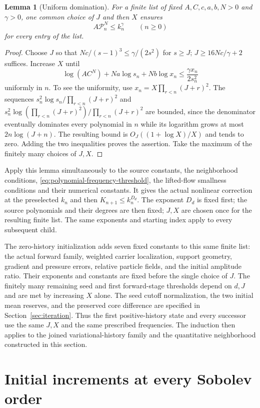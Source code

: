 \documentclass[11pt]{article}
\newtheorem{lemma}[theorem]{Lemma}
\theoremstyle{definition}
\begin{document}
\begin{lemma}[Uniform domination]\label{lem:uniform-source-domination}
For a finite list of fixed $A,C,c,a,b,N>0$ and $\gamma>0$, one common
choice of $J$ and then $X$ ensures
\[
 A\mathcal P_n^N\leq k_n^\gamma\qquad(n\geq0)
\]
for every entry of the list.
\end{lemma}
\begin{proof}
Choose $J$ so that
$Nc/(s-1)^3\leq\gamma/(2s^2)$ for $s\geq J$;
$J\geq16Nc/\gamma+2$ suffices. Increase $X$ until
\[
 \log(AC^N)+Na\log s_n+Nb\log x_n
 \leq\frac{\gamma x_n}{2s_n^2}
\]
uniformly in $n$. To see the uniformity, use
$x_n=X\prod_{r<n}(J+r)^2$.
The sequences
$s_n^2\log s_n/\prod_{r<n}(J+r)^2$ and
$s_n^2\log(\prod_{r<n}(J+r)^2)/\prod_{r<n}(J+r)^2$
are bounded, since the denominator eventually dominates every
polynomial in $n$ while its logarithm grows at most
$2n\log(J+n)$. The resulting bound is
$O_J((1+\log X)/X)$ and tends to zero.
Adding the two inequalities proves the assertion. Take the maximum
of the finitely many choices of $J,X$.
\end{proof}

Apply this lemma simultaneously to the source constants, the neighborhood
conditions, \eqref{eq:polynomial-frequency-threshold}, the lifted-flow smallness
conditions and their numerical constants. It gives the actual nonlinear
correction at the preselected $k_n$ and then
$K_{n+1}\leq k_n^{D_d}$. The exponent $D_d$ is fixed first;
the source polynomials and their degrees are then fixed; $J,X$ are
chosen once for the resulting finite list. The same exponents and starting
index apply to every subsequent child.

The zero-history initialization adds seven fixed constants to this same
finite list: the actual forward family, weighted carrier localization,
support geometry, gradient and pressure errors, relative particle
fields, and the initial amplitude ratio. Their exponents and constants
are fixed before the single choice of $J$. The finitely many remaining
seed and first forward-stage thresholds depend on $d,J$ and
are met by increasing $X$ alone. The seed cutoff normalization, the two
initial mean reserves, and the preserved core difference are specified
in Section~\ref{sec:iteration}. Thus the first positive-history state
and every successor use the same $J,X$ and the same prescribed
frequencies. The induction then applies to the joined variational-history
family and the quantitative neighborhood constructed in this section.
\section{Initial increments at every Sobolev order}
\label{sec:initial-summability}
\end{document}
